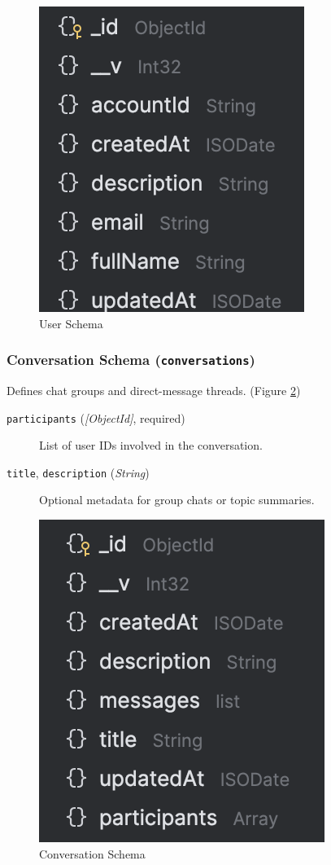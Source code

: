 \begin{figure}[H]
  \centering
  \includegraphics{profile-schema.png}
  \caption{User Schema}
  \label{fig:profile-schema}
\end{figure}

\subsubsection{Conversation Schema (\texttt{conversations})}
Defines chat groups and direct-message threads. (Figure \ref{fig:conversation-schema})
\begin{description}
  \item[\texttt{participants} (\emph{[ObjectId]}, required)]  
    List of user IDs involved in the conversation.
  \item[\texttt{title}, \texttt{description} (\emph{String})]  
    Optional metadata for group chats or topic summaries.
\end{description}

\begin{figure}[H]
  \centering
  \includegraphics{conversation-schema.png}
  \caption{Conversation Schema}
  \label{fig:conversation-schema}
\end{figure}

